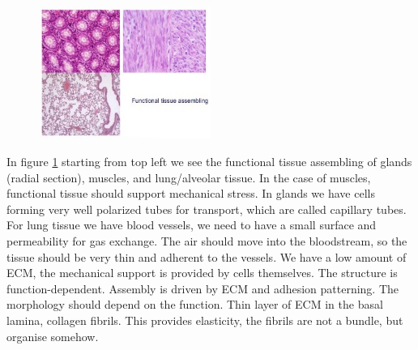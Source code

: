 \begin{figure}[h]
\centering
\includegraphics[width=0.5\textwidth]{functionaltissue}
\caption{\label{fig:funtis}}
\end{figure}

In figure \ref{fig:funtis} starting from top left we see the functional tissue assembling of glands (radial section), muscles, and lung/alveolar tissue. In the case of muscles, functional tissue should support mechanical stress. In glands we have cells forming very well polarized tubes for transport, which are called capillary tubes. For lung tissue we have blood vessels, we need to have a small surface and permeability for gas exchange. The air should move into the bloodstream,  so the tissue should be very thin and adherent to the vessels. We have a low amount of ECM, the mechanical support is provided by cells themselves. The structure is function-dependent.
Assembly is driven by ECM and adhesion patterning. The morphology should depend on the function. Thin layer of ECM in the basal lamina, collagen fibrils. This provides elasticity, the fibrils are not a bundle, but organise somehow.


